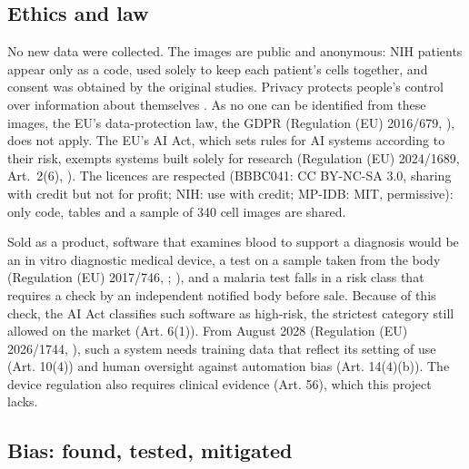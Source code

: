\documentclass[11pt,a4paper]{article}
\begin{document}
\subsection{Ethics and law}

No new data were collected. The images are public and anonymous: NIH patients appear only as a code, used solely to keep each patient's cells together, and consent was obtained by the original studies. Privacy protects people's control over information about themselves \citep{veliz2020}. As no one can be identified from these images, the EU's data-protection law, the GDPR (Regulation (EU) 2016/679, \citealp{gdpr2016}), does not apply. The EU's AI Act, which sets rules for AI systems according to their risk, exempts systems built solely for research (Regulation (EU) 2024/1689, Art.~2(6), \citealp{aiact2024}). The licences are respected (BBBC041: CC BY-NC-SA 3.0, sharing with credit but not for profit; NIH: use with credit; MP-IDB: MIT, permissive): only code, tables and a sample of 340 cell images are shared.

Sold as a product, software that examines blood to support a diagnosis would be an in vitro diagnostic medical device, a test on a sample taken from the body (Regulation (EU) 2017/746, \citealp{ivdr2017}; \citealp{mdcg2019}), and a malaria test falls in a risk class that requires a check by an independent notified body before sale. Because of this check, the AI Act classifies such software as high-risk, the strictest category still allowed on the market (Art. 6(1)). From August 2028 (Regulation (EU) 2026/1744, \citealp{omnibus2026}), such a system needs training data that reflect its setting of use (Art. 10(4)) and human oversight against automation bias (Art. 14(4)(b)). The device regulation also requires clinical evidence (Art. 56), which this project lacks.

\subsection{Bias: found, tested, mitigated}
\end{document}
